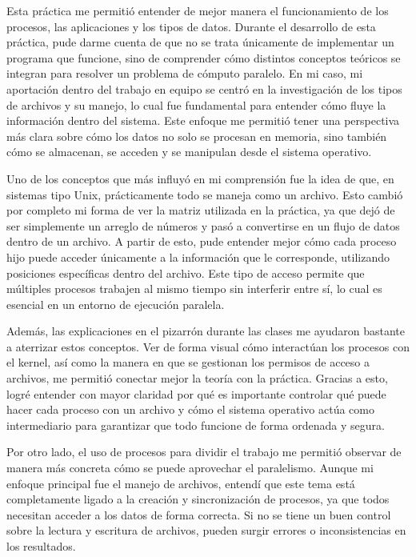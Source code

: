 Esta práctica me permitió entender de mejor manera el funcionamiento de los procesos, las aplicaciones y los tipos de datos. Durante el desarrollo de esta práctica, pude darme cuenta de que no se trata únicamente de implementar un programa que funcione, sino de comprender cómo distintos conceptos teóricos se integran para resolver un problema de cómputo paralelo. En mi caso, mi aportación dentro del trabajo en equipo se centró en la investigación de los tipos de archivos y su manejo, lo cual fue fundamental para entender cómo fluye la información dentro del sistema. Este enfoque me permitió tener una perspectiva más clara sobre cómo los datos no solo se procesan en memoria, sino también cómo se almacenan, se acceden y se manipulan desde el sistema operativo.

Uno de los conceptos que más influyó en mi comprensión fue la idea de que, en sistemas tipo Unix, prácticamente todo se maneja como un archivo. Esto cambió por completo mi forma de ver la matriz utilizada en la práctica, ya que dejó de ser simplemente un arreglo de números y pasó a convertirse en un flujo de datos dentro de un archivo. A partir de esto, pude entender mejor cómo cada proceso hijo puede acceder únicamente a la información que le corresponde, utilizando posiciones específicas dentro del archivo. Este tipo de acceso permite que múltiples procesos trabajen al mismo tiempo sin interferir entre sí, lo cual es esencial en un entorno de ejecución paralela.

Además, las explicaciones en el pizarrón durante las clases me ayudaron bastante a aterrizar estos conceptos. Ver de forma visual cómo interactúan los procesos con el kernel, así como la manera en que se gestionan los permisos de acceso a archivos, me permitió conectar mejor la teoría con la práctica. Gracias a esto, logré entender con mayor claridad por qué es importante controlar qué puede hacer cada proceso con un archivo y cómo el sistema operativo actúa como intermediario para garantizar que todo funcione de forma ordenada y segura.

Por otro lado, el uso de procesos para dividir el trabajo me permitió observar de manera más concreta cómo se puede aprovechar el paralelismo. Aunque mi enfoque principal fue el manejo de archivos, entendí que este tema está completamente ligado a la creación y sincronización de procesos, ya que todos necesitan acceder a los datos de forma correcta. Si no se tiene un buen control sobre la lectura y escritura de archivos, pueden surgir errores o inconsistencias en los resultados.

